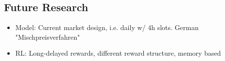 \documentclass[a4paper, 12pt]{article}
\begin{document}
\subsection{Future Research}
\label{sec:orgf04ba0d}
\begin{itemize}
\item Model: Current market design, i.e. daily w/ 4h slots. German "Mischpreisverfahren"
\item RL: Long-delayed rewards, different reward structure, memory based
\end{itemize}

\clearpage


\end{document}
